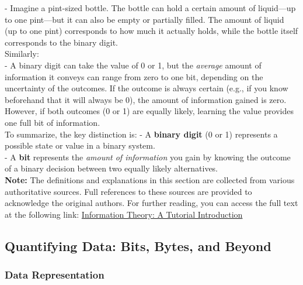 \documentclass[12pt, oneside]{book}
\begin{document}
- Imagine a pint-sized bottle. The bottle can hold a certain amount of liquid—up to one pint—but it can also be empty or partially filled. The amount of liquid (up to one pint) corresponds to how much it actually holds, while the bottle itself corresponds to the binary digit.\\
Similarly:\\
- A binary digit can take the value of 0 or 1, but the \textit{average} amount of information it conveys can range from zero to one bit, depending on the uncertainty of the outcomes. If the outcome is always certain (e.g., if you know beforehand that it will always be 0), the amount of information gained is zero. However, if both outcomes (0 or 1) are equally likely, learning the value provides one full bit of information.\\
To summarize, the key distinction is:
- A \textbf{binary digit} (0 or 1) represents a possible state or value in a binary system.\\
- A \textbf{bit} represents the \textit{amount of information} you gain by knowing the outcome of a binary decision between two equally likely alternatives.\\
\textbf{Note:} The definitions and explanations in this section are collected from various authoritative sources. Full references to these sources are provided to acknowledge the original authors. For further reading, you can access the full text at the following link: 
\href{https://arxiv.org/pdf/1802.05968}{Information Theory: A Tutorial Introduction}
\subsection{Quantifying Data: Bits, Bytes, and Beyond}

\subsubsection{Data Representation}
\end{document}
